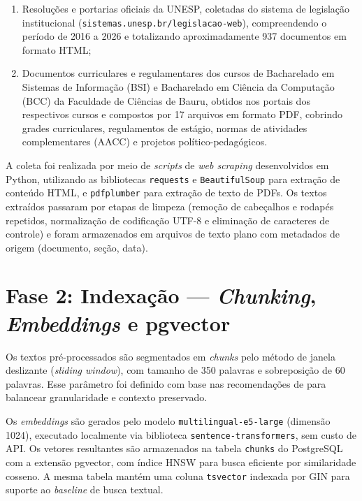 \documentclass[
  12pt,
  openright,
  twoside,
  a4paper,
  brazil
]{abntex2}
\begin{document}
\begin{enumerate}[label=\alph*)]
  \item Resoluções e portarias oficiais da UNESP, coletadas do sistema de legislação institucional (\texttt{sistemas.unesp.br/legislacao-web}), compreendendo o período de 2016 a 2026 e totalizando aproximadamente 937 documentos em formato HTML;

  \item Documentos curriculares e regulamentares dos cursos de Bacharelado em Sistemas de Informação (BSI) e Bacharelado em Ciência da Computação (BCC) da Faculdade de Ciências de Bauru, obtidos nos portais dos respectivos cursos e compostos por 17 arquivos em formato PDF, cobrindo grades curriculares, regulamentos de estágio, normas de atividades complementares (AACC) e projetos político-pedagógicos.
\end{enumerate}

A coleta foi realizada por meio de \textit{scripts} de \textit{web scraping} desenvolvidos em Python, utilizando as bibliotecas \texttt{requests} e \texttt{BeautifulSoup} para extração de conteúdo HTML, e \texttt{pdfplumber} para extração de texto de PDFs. Os textos extraídos passaram por etapas de limpeza (remoção de cabeçalhos e rodapés repetidos, normalização de codificação UTF-8 e eliminação de caracteres de controle) e foram armazenados em arquivos de texto plano com metadados de origem (documento, seção, data).

\section{Fase 2: Indexação --- \textit{Chunking}, \textit{Embeddings} e pgvector}

Os textos pré-processados são segmentados em \textit{chunks} pelo método de janela deslizante (\textit{sliding window}), com tamanho de 350 palavras e sobreposição de 60 palavras. Esse parâmetro foi definido com base nas recomendações de  para balancear granularidade e contexto preservado.

Os \textit{embeddings} são gerados pelo modelo \texttt{multilingual-e5-large} (dimensão 1024), executado localmente via biblioteca \texttt{sentence-transformers}, sem custo de API. Os vetores resultantes são armazenados na tabela \texttt{chunks} do PostgreSQL com a extensão pgvector, com índice HNSW para busca eficiente por similaridade cosseno. A mesma tabela mantém uma coluna \texttt{tsvector} indexada por GIN para suporte ao \textit{baseline} de busca textual.
\end{document}
